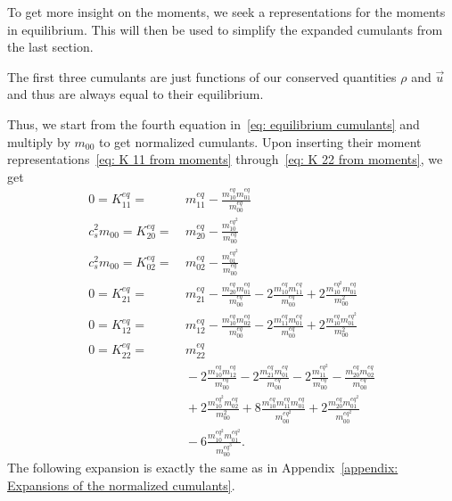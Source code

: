 
To get more insight on the moments, we seek a representations for the moments in equilibrium.
This will then be used to simplify the expanded cumulants from the last section.

The first three cumulants are just functions of our conserved quantities $\rho$ and $\vec{u}$ and thus are always equal to their equilibrium.

Thus, we start from the fourth equation in~\eqref{eq: equilibrium cumulants} and multiply by $m_{00}$ to get normalized cumulants.
Upon inserting their moment representations~\eqref{eq: K 11 from moments} through~\eqref{eq: K 22 from moments}, we get
\begin{equation}
  \begin{aligned}
    0 = K_{11}^{eq} = &\ m_{11}^{eq} - \frac{m_{10}^{eq}m_{01}^{eq}}{m_{00}^{eq}}
    \\
    c_s^2 m_{00} = K_{20}^{eq} = &\ m_{20}^{eq} - \frac{m_{10}^{{eq}^2}}{m_{00}^{eq}}
    \\
    c_s^2 m_{00} = K_{02}^{eq} = &\ m_{02}^{eq} - \frac{m_{01}^{{eq}^2}}{m_{00}^{eq}}
    \\
    0 = K_{21}^{eq} = &\ m_{21}^{eq} - \frac{m_{20}^{eq}m_{01}^{eq}}{m_{00}^{eq}} - 2\frac{m_{10}^{eq}m_{11}^{eq}} {m_{00}^{eq}} + 2\frac{m_{10}^{{eq}^2} m_{01}^{eq}}{m_{00}^2}
    \\
    0 = K_{12}^{eq} = &\ m_{12}^{eq} - \frac{m_{10}^{eq}m_{02}^{eq}}{m_{00}^{eq}}
    - 2\frac{m_{11}^{eq}m_{01}^{eq}}{m_{00}^{eq}} + 2\frac{m_{10}^{eq} m_{01}^{{eq}^2}}{m_{00}^2}
    \\
    0 = K_{22}^{eq} = &\ m_{22}^{eq}
    \\&\
    - 2 \frac{m_{10}^{eq}m_{12}^{eq}}{m_{00}^{eq}} - 2\frac{m_{21}^{eq}m_{01}^{eq}}{m_{00}^{eq}}
    - 2 \frac{m_{11}^{{eq}^2}}{m_{00}^{eq}} - \frac{m_{20}^{eq}m_{02}^{eq}}{m_{00}^{eq}}
    \\&\
    + 2 \frac{m_{10}^{{eq}^2} m_{02}^{eq}}{m_{00}^2} + 8 \frac{m_{10}^{eq}m_{11}^{eq}m_{01}^{eq}} {m_{00}^{{eq}^2}}
    + 2 \frac{m_{20}^{eq}m_{01}^{{eq}^2}}{m_{00}^{{eq}^2}}
    \\&\
    - 6 \frac{m_{10}^{{eq}^2} m_{01}^{{eq}^2}}{m_{00}^{{eq}^3}}.
  \end{aligned}
\end{equation}
The following expansion is exactly the same as in Appendix~\ref{appendix: Expansions of the normalized cumulants}.

